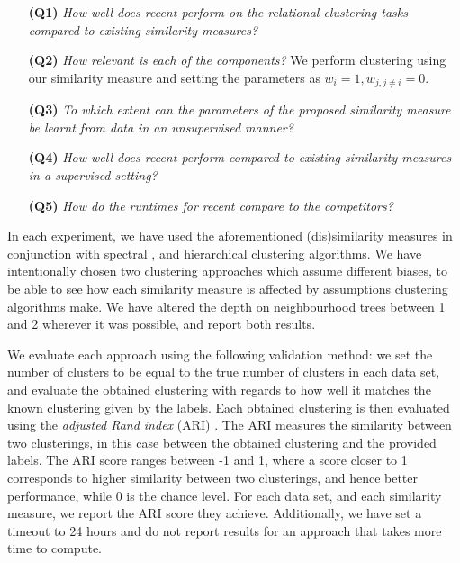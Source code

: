 \begin{itemize}
    \item[\textbf{(Q1)}]\textit{How well does \gls{recent} perform on the relational clustering tasks compared to existing similarity measures?}

    \item[\textbf{(Q2)}] \textit{How relevant is each of the components?}  We perform clustering using our similarity measure and setting the parameters as $w_i = 1, w_{j, j \not=i}=0$.

    \item[\textbf{(Q3)}] \textit{To which extent can the parameters of the proposed similarity measure  be learnt from data in an unsupervised manner?}

    \item[\textbf{(Q4)}] \textit{How well does \gls{recent} perform compared to existing similarity measures in a supervised setting?}

    \item[\textbf{(Q5)}] \textit{How do the runtimes for \gls{recent} compare to the competitors?}
\end{itemize}








In each experiment, we have used the aforementioned (dis)similarity measures in conjunction with spectral \cite{Spectral},  and hierarchical \cite{Agglomerative} clustering algorithms.
We have intentionally chosen two clustering approaches which assume different biases, to be able to see how each similarity measure is affected by assumptions clustering algorithms make.
We have altered the depth on neighbourhood trees between 1 and 2 wherever it was possible, and report both results.




We evaluate each approach using the following validation method: we set the number of clusters to be equal to the true number of clusters in each data set, and evaluate the obtained clustering with regards to how well it matches the known clustering given by the labels.
Each obtained clustering is then evaluated using the \textit{adjusted Rand index} (ARI)  \cite{Rand71,MoreyARI}.
The ARI measures the similarity between two clusterings, in this case between the obtained clustering and the provided labels.
The ARI score ranges between -1 and 1, where a score closer to 1 corresponds to higher similarity between two clusterings, and hence better performance, while 0 is the chance level.
For each data set, and each similarity measure, we report the ARI score they achieve.
Additionally, we have set a timeout to 24 hours and do not report results for an approach that takes more time to compute.





